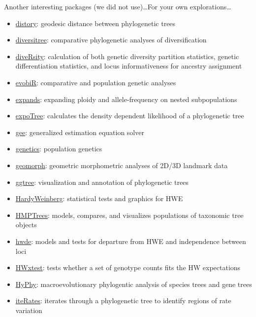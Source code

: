 \documentclass[compress, ucs, xelatex, 11pt, xcolor=svgnames,
  hyperref={
    bookmarks=true,
    unicode=true,
    colorlinks=true,
    pdftitle={Molecular data in R},
    plainpages=false,
    pdfauthor={Vojtech Zeisek},
    pdfsubject={Course about phylogeny and evolution in R},
    pdfcreator={XeLaTeX},
    pdfkeywords={R, evolution, phylogeny, molecular data},
    linkcolor=Tomato,
    anchorcolor=SaddleBrown,
    citecolor=Goldenrod,
    filecolor=DarkMagenta,
    menucolor=Sienna,
    urlcolor=DarkTurquoise,
    pdftex},
  url={hyphens, lowtilde} %
  ]{beamer}
\begin{document}
\begin{frame}[allowframebreaks]{Another interesting packages (we did not use)\ldots}{For your own explorations\ldots}
\begin{itemize}
    \item \href{https://cran.r-project.org/package=DiscML}{distory}: geodesic distance between phylogenetic trees
    \item \href{https://cran.r-project.org/package=diversitree}{diversitree}: comparative phylogenetic analyses of diversification
    \item \href{https://cran.r-project.org/package=diveRsity}{diveRsity}: calculation of both genetic diversity partition statistics, genetic differentiation statistics, and locus informativeness for ancestry assignment
    \item \href{https://cran.r-project.org/package=evobiR}{evobiR}: comparative and population genetic analyses
    \item \href{https://cran.r-project.org/package=expands}{expands}: expanding ploidy and allele-frequency on nested subpopulations
    \item \href{https://cran.r-project.org/package=expoTree}{expoTree}: calculates the density dependent likelihood of a phylogenetic tree
    \item \href{https://cran.r-project.org/package=gee}{gee}: generalized estimation equation solver
    \item \href{https://cran.r-project.org/package=genetics}{genetics}: population genetics
    \item \href{https://cran.r-project.org/package=geomorph}{geomorph}: geometric morphometric analyses of 2D/3D landmark data
    \item \href{https://www.bioconductor.org/packages/3.4/bioc/html/ggtree.html}{ggtree}: visualization and annotation of phylogenetic trees
    \item \href{https://cran.r-project.org/package=HardyWeinberg}{HardyWeinberg}: statistical tests and graphics for HWE
    \item \href{https://cran.r-project.org/package=HMPTrees}{HMPTrees}: models, compares, and visualizes populations of taxonomic tree objects
    \item \href{https://cran.r-project.org/package=hwde}{hwde}: models and tests for departure from HWE and independence between loci
    \item \href{https://cran.r-project.org/package=HWxtest}{HWxtest}: tests whether a set of genotype counts fits the HW expectations
    \item \href{https://cran.r-project.org/package=HyPhy}{HyPhy}: macroevolutionary phylogentic analysis of species trees and gene trees
    \item \href{https://cran.r-project.org/package=iteRates}{iteRates}: iterates through a phylogenetic tree to identify regions of rate variation

\end{itemize}
\end{frame}
\end{document}
